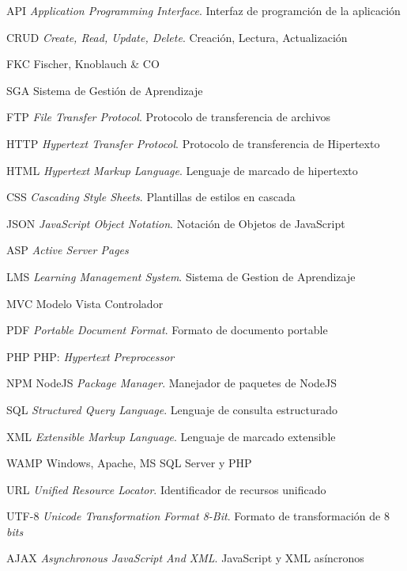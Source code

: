 	{API}
	{\emph{Application Programming Interface}. Interfaz de programción de la aplicación}

	{CRUD}
	{\emph{Create, Read, Update, Delete}. Creación, Lectura, Actualización}

	{FKC}
	{Fischer, Knoblauch \& CO}
	
	{SGA}
	{Sistema de Gestión de Aprendizaje}

	{FTP}
	{\emph{File Transfer Protocol}. Protocolo de transferencia de archivos}

	{HTTP}
	{\emph{Hypertext Transfer Protocol}. Protocolo de transferencia de Hipertexto}

	{HTML}
	{\emph{Hypertext Markup Language}. Lenguaje de marcado de hipertexto}

	{CSS}
	{\emph{Cascading Style Sheets}. Plantillas de estilos en cascada}

	{JSON}
	{\emph{JavaScript Object Notation}. Notación de Objetos de JavaScript}

	{ASP}
	{\emph{Active Server Pages}}

	{LMS}
	{\emph{Learning Management System}. Sistema de Gestion de Aprendizaje}

	{MVC}
	{Modelo Vista Controlador}

	{PDF}
	{\emph{Portable Document Format}. Formato de documento portable}

	{PHP}
	{PHP: \emph{Hypertext Preprocessor}}

	{NPM}
	{NodeJS \emph{Package Manager}. Manejador de paquetes de NodeJS}

	{SQL}
	{\emph{Structured Query Language}. Lenguaje de consulta estructurado}

	{XML}
	{\emph{Extensible Markup Language}. Lenguaje de marcado extensible}

	{WAMP}
	{Windows, Apache, MS SQL Server y PHP}

	{URL}
	{\emph{Unified Resource Locator}. Identificador de recursos unificado}

	{UTF-8}
	{\emph{Unicode Transformation Format 8-Bit}. Formato de transformación de 8 \emph{bits}}

	{AJAX}
	{\emph{Asynchronous JavaScript And XML}. JavaScript y XML asíncronos}

